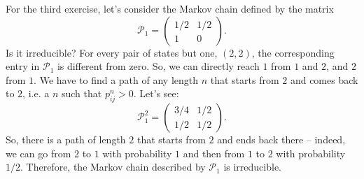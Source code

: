 For the third exercise, let’s consider the Markov chain defined by the matrix
\begin{equation}
    \mathcal{P}_{1} =
    \begin{pmatrix}
        1/2 & 1/2 \\
         1  &  0
    \end{pmatrix}.
\end{equation}
Is it irreducible? For every pair of states but one, $(2, 2)$, the corresponding
entry in $\mathcal{P}_1$ is different from zero. So, we can directly reach $1$
from $1$ and $2$, and $2$ from $1$. We have to find a path of any length $n$
that starts from $2$ and comes back to $2$, i.e. a $n$ such that $p^{n}_{ij} >
0$. Let’s see:
\begin{equation}
    \mathcal{P}_{1}^{2} =
    \begin{pmatrix}
        3/4 & 1/2 \\
        1/2 & 1/2
    \end{pmatrix}.
\end{equation}
So, there is a path of length $2$ that starts from $2$ and ends back there –
indeed, we can go from $2$ to $1$ with probability $1$ and then from $1$ to $2$
with probability $1/2$. Therefore, the Markov chain described by $\mathcal{P}_1$
is irreducible.

